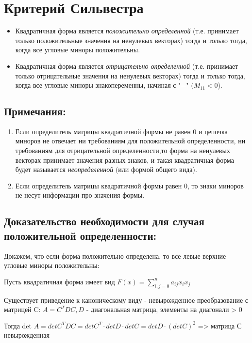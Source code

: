 \documentclass[12pt]{article}
\begin{document}
\section{Критерий Сильвестра}
\begin{itemize}
    \item Квадратичная форма является \textit{положительно определенной} (т.е.  принимает только положительные значения на ненулевых векторах) тогда и только тогда, когда все угловые миноры положительны.
    \item Квадратичная форма является \textit{отрицательно определенной} (т.е.  принимает только отрицательные значения на ненулевых векторах) тогда и только тогда, когда все угловые миноры знакопеременны, начиная с "$-$" ($M_{11} < 0$).
\end{itemize}
\subsection{Примечания:}

\begin{enumerate}
    \item Если определитель матрицы квадратичной формы не равен 0 и цепочка миноров не отвечает ни требованиям для положительной определенности, ни требованиям для отрицательной определенности,то форма на ненулевых векторах принимает значения разных знаков, и такая квадратичная форма будет называется  \textit{неопределенной} (или формой общего вида).
    \item Если определитель матрицы квадратичной формы равен 0, то знаки миноров не несут информации про значения формы.
\end{enumerate}

\subsection{Доказательство необходимости для случая положительной определенности:}

Докажем, что если форма положительно определена, то все левые верхние угловые миноры положительны:

Пусть квадратичная форма имеет вид $F(x) = \sum\limits_{i,j=0}^n a_{ij} x_{i} x_{j}$

Существует приведение к каноническому виду - невырожденное преобразование с матрицей C:
$A = C^{T}DC, D$ - диагональная матрица, элементы на диагонали > 0

Тогда det $A = det C^{T}DC = det C^{T} \cdot det D \cdot det C = det D \cdot (detC)^{2}$ => матрица С невырожденная
\end{document}
